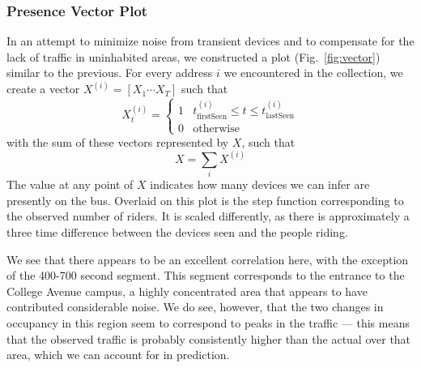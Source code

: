 \subsubsection*{Presence Vector Plot}

In an attempt to minimize noise from transient devices and to compensate for the lack of traffic in uninhabited areas, we constructed a plot (Fig.~\ref{fig:vector}) similar to the previous.
For every address $i$ we encountered in the collection, we create a vector \(X^{(i)}= [ X_1 \cdots X_T ] \) such that
\begin{equation*}
  X_t^{(i)} = \begin{cases}
    1 & t_{\text{firstSeen}}^{(i)} \le t \le t_{\text{lastSeen}}^{(i)}\\
    0 & \text{otherwise}
  \end{cases}
\end{equation*}
with the sum of these vectors represented by $X$, such that \[X = \sum\limits_i X^{(i)}\]
The value at any point of $X$ indicates how many devices we can infer are presently on the bus.
Overlaid on this plot is the step function corresponding to the observed number of riders.
It is scaled differently, as there is approximately a three time difference between the devices seen and the people riding.

We see that there appears to be an excellent correlation here, with the exception of the 400-700 second segment. %
This segment corresponds to the entrance to the College Avenue campus, a highly concentrated area that appears to have contributed considerable noise.
We do see, however, that the two changes in occupancy in this region seem to correspond to peaks in the traffic --- this means that the observed traffic is probably consistently higher than the actual over that area, which we can account for in prediction.
